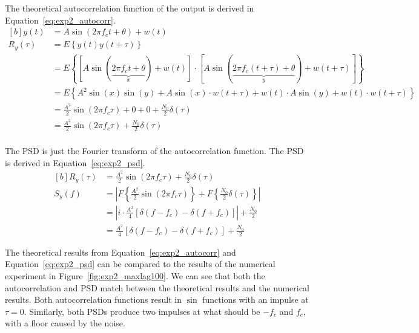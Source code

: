 \documentclass[12pt]{article}
\begin{document}
The theoretical autocorrelation function of the output is derived in Equation~\ref{eq:exp2_autocorr}.
\begin{equation} \label{eq:exp2_autocorr}
\begin{aligned}[b]
	y(t) &= A\sin(2\pi f_ct + \theta) + w(t) \\
	R_y(\tau) &= E\left\{y(t)y(t+\tau)\right\} \\
	&= E\left \{\left[ A\sin(\underbrace{2 \pi f_c t + \theta}_{x}) + w(t) \right]\cdot \left[ A\sin(\underbrace{2 \pi f_c (t+\tau) + \theta}_{y}) + w(t+\tau) \right] \right \} \\
	&= E\left \{A^2\sin(x)\sin(y) + A\sin(x)\cdot w(t+\tau) + w(t)\cdot A\sin(y) + w(t)\cdot w(t+\tau)\right \} \\
	&= \frac{A^2}{2}\sin(2\pi f_c \tau) + 0 + 0 + \frac{N_0}{2}\delta(\tau) \\
	&= \frac{A^2}{2} \sin(2\pi f_c \tau) + \frac{N_0}{2}\delta(\tau) \\
\end{aligned}
\end{equation}

The PSD is just the Fourier transform of the autocorrelation function. The PSD is derived in Equation~\ref{eq:exp2_psd}.
\begin{equation} \label{eq:exp2_psd}
\begin{aligned}[b]
	R_y(\tau) &= \frac{A^2}{2} \sin(2\pi f_c \tau) + \frac{N_0}{2}\delta(\tau) \\
	S_y(f) &= \left |F\left \{\frac{A^2}{2} \sin(2\pi f_c \tau) \right \} + F\left \{\frac{N_0}{2}\delta(\tau) \right \}\right | \\
	&= \left | i \cdot \frac{A^2}{4} \left [\delta(f - f_c) - \delta(f + f_c)\right ]\right | + \frac{N_0}{2} \\
	&= \frac{A^2}{4} \left [\delta(f - f_c) - \delta(f + f_c)\right ] + \frac{N_0}{2}
\end{aligned}
\end{equation}

The theoretical results from Equation~\ref{eq:exp2_autocorr} and Equation~\ref{eq:exp2_psd} can be compared to the results of the numerical experiment in Figure~\ref{fig:exp2_maxlag100}. We can see that both the autocorrelation and PSD match between the theoretical results and the numerical results. Both autocorrelation functions result in $\sin$ functions with an impulse at $\tau = 0$. Similarly, both PSDs produce two impulses at what should be $-f_c$ and $f_c$, with a floor caused by the noise.
\end{document}
